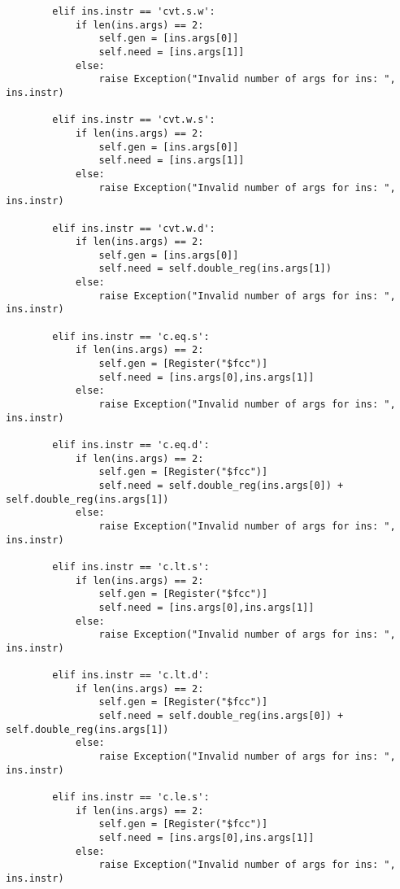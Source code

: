 \begin{lstlisting}
        elif ins.instr == 'cvt.s.w':
            if len(ins.args) == 2:
                self.gen = [ins.args[0]]
                self.need = [ins.args[1]]
            else:
                raise Exception("Invalid number of args for ins: ", ins.instr)
                                      
        elif ins.instr == 'cvt.w.s':
            if len(ins.args) == 2:
                self.gen = [ins.args[0]]
                self.need = [ins.args[1]]
            else:
                raise Exception("Invalid number of args for ins: ", ins.instr)
                                      
        elif ins.instr == 'cvt.w.d':
            if len(ins.args) == 2:
                self.gen = [ins.args[0]]
                self.need = self.double_reg(ins.args[1])
            else:
                raise Exception("Invalid number of args for ins: ", ins.instr)
                                      
        elif ins.instr == 'c.eq.s': 
            if len(ins.args) == 2:
                self.gen = [Register("$fcc")]
                self.need = [ins.args[0],ins.args[1]]
            else:
                raise Exception("Invalid number of args for ins: ", ins.instr)
                                      
        elif ins.instr == 'c.eq.d': 
            if len(ins.args) == 2:
                self.gen = [Register("$fcc")]
                self.need = self.double_reg(ins.args[0]) + self.double_reg(ins.args[1])
            else:
                raise Exception("Invalid number of args for ins: ", ins.instr)
                        
        elif ins.instr == 'c.lt.s': 
            if len(ins.args) == 2:
                self.gen = [Register("$fcc")]
                self.need = [ins.args[0],ins.args[1]]
            else:
                raise Exception("Invalid number of args for ins: ", ins.instr)
                         
        elif ins.instr == 'c.lt.d': 
            if len(ins.args) == 2:
                self.gen = [Register("$fcc")]
                self.need = self.double_reg(ins.args[0]) + self.double_reg(ins.args[1])
            else:
                raise Exception("Invalid number of args for ins: ", ins.instr)
                         
        elif ins.instr == 'c.le.s': 
            if len(ins.args) == 2:
                self.gen = [Register("$fcc")]
                self.need = [ins.args[0],ins.args[1]]
            else:
                raise Exception("Invalid number of args for ins: ", ins.instr)
                         

\end{lstlisting}
